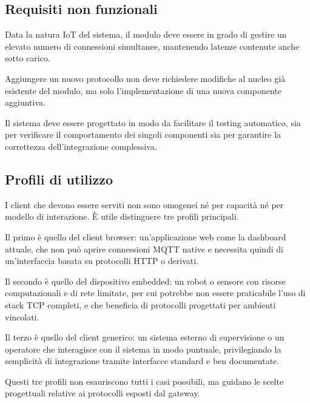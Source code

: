 \subsection{Requisiti non funzionali}
\label{subsec:requisiti-non-funzionali}
%
%
\begin{reqnonfun}
  \item \label{req:rqnf1} Data la natura IoT del sistema, il modulo deve essere in grado di gestire un elevato numero di connessioni simultanee, mantenendo latenze contenute anche sotto carico.

  \item \label{req:rqnf2} Aggiungere un nuovo protocollo non deve richiedere modifiche al nucleo già esistente del modulo, ma solo l'implementazione di una nuova componente aggiuntiva.

  \item \label{req:rqnf3} Il sistema deve essere progettato in modo da facilitare il testing automatico, sia per verificare il comportamento dei singoli componenti sia per garantire la correttezza dell'integrazione complessiva.
\end{reqnonfun}
%
\subsection{Profili di utilizzo}
\label{subsec:profili-di-utilizzo}
%
I client che devono essere serviti non sono omogenei né per capacità né per modello di interazione. È utile distinguere tre profili principali.

Il primo è quello del client browser: un'applicazione web come la dashboard attuale, che non può aprire connessioni \ac{MQTT} native e necessita quindi di un'interfaccia basata su protocolli HTTP o derivati.

Il secondo è quello del dispositivo embedded: un robot o sensore con risorse computazionali e di rete limitate, per cui potrebbe non essere praticabile l'uso di stack TCP completi, e che beneficia di protocolli progettati per ambienti vincolati.

Il terzo è quello del client generico: un sistema esterno di supervisione o un operatore che interagisce con il sistema in modo puntuale, privilegiando la semplicità di integrazione tramite interfacce standard e ben documentate.

Questi tre profili non esauriscono tutti i casi possibili, ma guidano le scelte progettuali relative ai protocolli esposti dal gateway.
%
